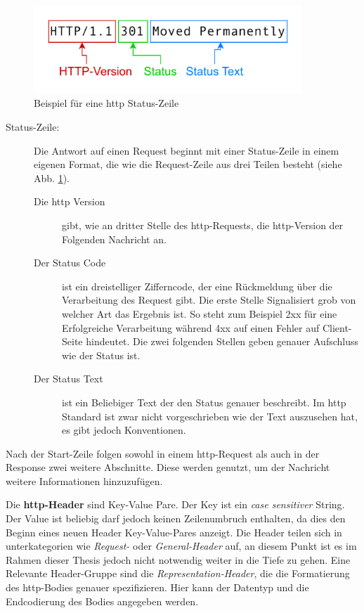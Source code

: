 \begin{figure}[!hbt]
     \centering
     \includegraphics[width=0.9\textwidth]{./images/HTTP-Statusline.png}
     \caption{Beispiel für eine \ac{http} Status-Zeile}
     \label{fig:http-statusline}
 \end{figure}


\begin{description}
     \item[Status-Zeile:] Die Antwort auf einen Request beginnt mit einer Status-Zeile in einem eigenen Format, die wie die Request-Zeile aus drei Teilen besteht (siehe Abb. \ref{fig:http-statusline}).
     \begin{description}
          \item[Die \ac{http} Version] gibt, wie an dritter Stelle des \ac{http}-Requests, die \ac{http}-Version der Folgenden Nachricht an.
          \item[Der Status Code] ist ein dreistelliger Zifferncode, der eine Rückmeldung über die Verarbeitung des Request gibt. 
          Die erste Stelle Signalisiert grob von welcher Art das Ergebnis ist. 
          So steht zum Beispiel 2xx für eine Erfolgreiche Verarbeitung während 4xx auf einen Fehler auf Client-Seite hindeutet.
          Die zwei folgenden Stellen geben genauer Aufschluss wie der Status ist\cite{HTTPResponseStatus2023}.
          \item[Der Status Text] ist ein Beliebiger Text der den Status genauer beschreibt.
          Im \ac{http} Standard ist zwar nicht vorgeschrieben wie der Text auszusehen hat, es gibt jedoch Konventionen\cite{HTTPResponseStatus2023}.
     \end{description}
\end{description}

Nach der Start-Zeile folgen sowohl in einem \ac{http}-Request als auch in der Response zwei weitere Abschnitte. 
Diese werden genutzt, um der Nachricht weitere Informationen hinzuzufügen.

Die \textbf{\ac{http}-Header} sind Key-Value Pare. Der Key ist ein \textit{case sensitiver} String.
Der Value ist beliebig darf jedoch keinen Zeilenumbruch enthalten, da dies den Beginn eines neuen Header Key-Value-Pares anzeigt.
Die Header teilen sich in unterkategorien wie \textit{Request-} oder \textit{General-Header} auf, an diesem Punkt ist es im Rahmen dieser Thesis jedoch nicht notwendig weiter in die Tiefe zu gehen.
Eine Relevante Header-Gruppe sind die \textit{Representation-Header}, die die Formatierung des \ac{http}-Bodies genauer spezifizieren.
Hier kann der Datentyp und die Endcodierung des Bodies angegeben werden.

